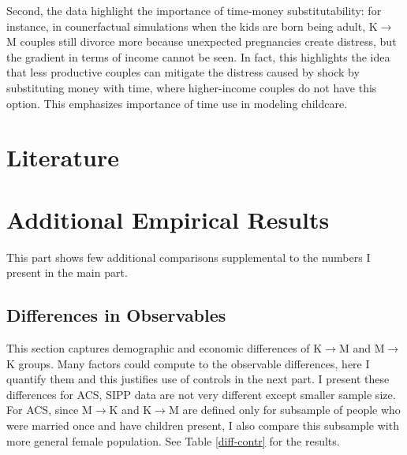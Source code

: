 \documentclass[12pt,letter]{article}
\begin{document}
Second, the data highlight the importance of time-money substitutability: for instance, in counerfactual simulations when the kids are born being adult, K$\to$M couples still divorce more because unexpected pregnancies create distress, but the gradient in terms of income cannot be seen. In fact, this highlights the idea that less productive couples can mitigate the distress caused by shock by substituting money with time, where higher-income couples do not have this option. This emphasizes importance of time use in modeling childcare.
\clearpage

\section*{Literature}



\newpage
\appendix
\section{Additional Empirical Results\label{extra-comparisons}}
This part shows few additional comparisons supplemental to the numbers I present in the main part.

\subsection{Differences in Observables\label{comp-diff-appendix}}
This section captures demographic and economic differences of K$\to$M and M$\to$K groups. Many factors could compute to the observable differences, here I quantify them and this justifies use of controls in the next part. I present these differences for ACS, SIPP data are not very different except smaller sample size. For ACS, since M$\to$K and K$\to$M are defined only for subsample of people who were married once and have children present, I also compare this subsample with more general female population. See Table \ref{diff-contr} for the results.
\end{document}
